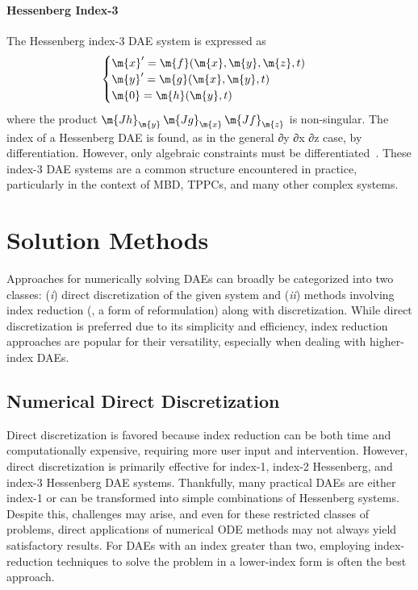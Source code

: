 \paragraph{Hessenberg Index-3}

The Hessenberg index-3 \ac{DAE} system is expressed as
%
\begin{equation*}
  \begin{cases}
    \m{x}^\prime = \m{f}(\m{x}, \m{y}, \m{z}, t) \\
    \m{y}^\prime = \m{g}(\m{x}, \m{y}, t) \\
    \m{0}        = \m{h}(\m{y}, t)
  \end{cases}
\end{equation*}
%
where the product $\m{Jh}_{\m{y}} \, \m{Jg}_{\m{x}} \, \m{Jf}_{\m{z}}$ is non-singular. The index of a Hessenberg DAE is found, as in the general ∂y ∂x ∂z
case, by differentiation. However, only algebraic constraints must be differentiated~\cite{ascher1991projected}. These index-3 \ac{DAE} systems are a common structure encountered in practice, particularly in the context of \ac{MBD}, \acp{TPPC}, and many other complex systems.


\section{Solution Methods}

Approaches for numerically solving \acp{DAE} can broadly be categorized into two classes: (\emph{i}) direct discretization of the given system and (\emph{ii}) methods involving index reduction (\eg{}, a form of reformulation) along with discretization. While direct discretization is preferred due to its simplicity and efficiency, index reduction approaches are popular for their versatility, especially when dealing with higher-index \acp{DAE}.

\subsection{Numerical Direct Discretization}

Direct discretization is favored because index reduction can be both time and computationally expensive, requiring more user input and intervention. However, direct discretization is primarily effective for index-1, index-2 Hessenberg, and index-3 Hessenberg \ac{DAE} systems. Thankfully, many practical \acp{DAE} are either index-1 or can be transformed into simple combinations of Hessenberg systems. Despite this, challenges may arise, and even for these restricted classes of problems, direct applications of numerical \ac{ODE} methods may not always yield satisfactory results. For \acp{DAE} with an index greater than two, employing index-reduction techniques to solve the problem in a lower-index form is often the best approach.

